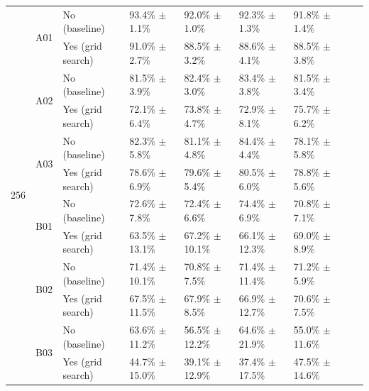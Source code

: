 \begin{table}[H]
\begin{tabular}{lllllllll}
        \toprule

            \multirow{12}{*}{256} & \multirow{2}{*}{A01} & No (baseline) & 93.4\% $\pm$ 1.1\% & 92.0\% $\pm$ 1.0\% & 92.3\% $\pm$ 1.3\% & 91.8\% $\pm$ 1.4\% \\
            & & Yes (grid search) & 91.0\% $\pm$ 2.7\% & 88.5\% $\pm$ 3.2\% & 88.6\% $\pm$ 4.1\% & 88.5\% $\pm$ 3.8\% \\
            \cmidrule{2-7}
            & \multirow{2}{*}{A02} & No (baseline) & 81.5\% $\pm$ 3.9\% & 82.4\% $\pm$ 3.0\% & 83.4\% $\pm$ 3.8\% & 81.5\% $\pm$ 3.4\% \\
            & & Yes (grid search) & 72.1\% $\pm$ 6.4\% & 73.8\% $\pm$ 4.7\% & 72.9\% $\pm$ 8.1\% & 75.7\% $\pm$ 6.2\% \\
            \cmidrule{2-7}
            & \multirow{2}{*}{A03} & No (baseline) & 82.3\% $\pm$ 5.8\% & 81.1\% $\pm$ 4.8\% & 84.4\% $\pm$ 4.4\% & 78.1\% $\pm$ 5.8\% \\
            & & Yes (grid search) & 78.6\% $\pm$ 6.9\% & 79.6\% $\pm$ 5.4\% & 80.5\% $\pm$ 6.0\% & 78.8\% $\pm$ 5.6\% \\
            \cmidrule{2-7}
            & \multirow{2}{*}{B01} & No (baseline) & 72.6\% $\pm$ 7.8\% & 72.4\% $\pm$ 6.6\% & 74.4\% $\pm$ 6.9\% & 70.8\% $\pm$ 7.1\% \\
            & & Yes (grid search) & 63.5\% $\pm$ 13.1\% & 67.2\% $\pm$ 10.1\% & 66.1\% $\pm$ 12.3\% & 69.0\% $\pm$ 8.9\% \\
            \cmidrule{2-7}
            & \multirow{2}{*}{B02} & No (baseline) & 71.4\% $\pm$ 10.1\% & 70.8\% $\pm$ 7.5\% & 71.4\% $\pm$ 11.4\% & 71.2\% $\pm$ 5.9\% \\
            & & Yes (grid search) & 67.5\% $\pm$ 11.5\% & 67.9\% $\pm$ 8.5\% & 66.9\% $\pm$ 12.7\% & 70.6\% $\pm$ 7.5\% \\
            \cmidrule{2-7}
            & \multirow{2}{*}{B03} & No (baseline) & 63.6\% $\pm$ 11.2\% & 56.5\% $\pm$ 12.2\% & 64.6\% $\pm$ 21.9\% & 55.0\% $\pm$ 11.6\% \\
            & & Yes (grid search) & 44.7\% $\pm$ 15.0\% & 39.1\% $\pm$ 12.9\% & 37.4\% $\pm$ 17.5\% & 47.5\% $\pm$ 14.6\% \\

        \toprule


\end{tabular}
\end{table}
